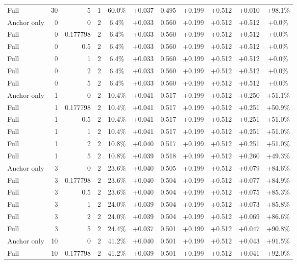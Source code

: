 \begin{table}[htbp]
\begin{tabular}{lrrrccccccc}
Full & 30 & 5 & 1 & 60.0\% & +0.037 & 0.495 & +0.199 & +0.512 & +0.010 & +98.1\% \\
Anchor only & 0 & 0 & 2 & 6.4\% & +0.033 & 0.560 & +0.199 & +0.512 & +0.512 & +0.0\% \\
Full & 0 & 0.177798 & 2 & 6.4\% & +0.033 & 0.560 & +0.199 & +0.512 & +0.512 & +0.0\% \\
Full & 0 & 0.5 & 2 & 6.4\% & +0.033 & 0.560 & +0.199 & +0.512 & +0.512 & +0.0\% \\
Full & 0 & 1 & 2 & 6.4\% & +0.033 & 0.560 & +0.199 & +0.512 & +0.512 & +0.0\% \\
Full & 0 & 2 & 2 & 6.4\% & +0.033 & 0.560 & +0.199 & +0.512 & +0.512 & +0.0\% \\
Full & 0 & 5 & 2 & 6.4\% & +0.033 & 0.560 & +0.199 & +0.512 & +0.512 & +0.0\% \\
Anchor only & 1 & 0 & 2 & 10.4\% & +0.041 & 0.517 & +0.199 & +0.512 & +0.250 & +51.1\% \\
Full & 1 & 0.177798 & 2 & 10.4\% & +0.041 & 0.517 & +0.199 & +0.512 & +0.251 & +50.9\% \\
Full & 1 & 0.5 & 2 & 10.4\% & +0.041 & 0.517 & +0.199 & +0.512 & +0.251 & +51.0\% \\
Full & 1 & 1 & 2 & 10.4\% & +0.041 & 0.517 & +0.199 & +0.512 & +0.251 & +51.0\% \\
Full & 1 & 2 & 2 & 10.8\% & +0.040 & 0.517 & +0.199 & +0.512 & +0.251 & +51.0\% \\
Full & 1 & 5 & 2 & 10.8\% & +0.039 & 0.518 & +0.199 & +0.512 & +0.260 & +49.3\% \\
Anchor only & 3 & 0 & 2 & 23.6\% & +0.040 & 0.505 & +0.199 & +0.512 & +0.079 & +84.6\% \\
Full & 3 & 0.177798 & 2 & 23.6\% & +0.040 & 0.504 & +0.199 & +0.512 & +0.077 & +84.9\% \\
Full & 3 & 0.5 & 2 & 23.6\% & +0.040 & 0.504 & +0.199 & +0.512 & +0.075 & +85.3\% \\
Full & 3 & 1 & 2 & 24.0\% & +0.039 & 0.504 & +0.199 & +0.512 & +0.073 & +85.8\% \\
Full & 3 & 2 & 2 & 24.0\% & +0.039 & 0.504 & +0.199 & +0.512 & +0.069 & +86.6\% \\
Full & 3 & 5 & 2 & 24.4\% & +0.037 & 0.501 & +0.199 & +0.512 & +0.047 & +90.8\% \\
Anchor only & 10 & 0 & 2 & 41.2\% & +0.040 & 0.501 & +0.199 & +0.512 & +0.043 & +91.5\% \\
Full & 10 & 0.177798 & 2 & 41.2\% & +0.039 & 0.501 & +0.199 & +0.512 & +0.041 & +92.0\% \\

\end{tabular}
\end{table}
